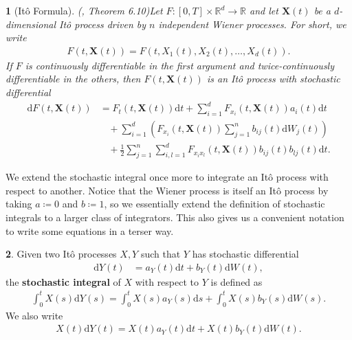 \documentclass[english]{article}
\numberwithin{equation}{section}
\numberwithin{figure}{section}
\theoremstyle{bolddescit}
\newtheorem{theorem}{\protect\theoremname}[section]
\theoremstyle{definition}
\newtheorem{definition}[theorem]{\protect\definitionname}
\theoremstyle{definition}
\theoremstyle{plain}
\theoremstyle{plain}
\theoremstyle{bolddesc}
\theoremstyle{plain}
\theoremstyle{remark}
\providecommand{\definitionname}{Definition}
\providecommand{\theoremname}{Theorem}
\begin{document}
\begin{theorem}[It\^o Formula]
  (\cite{capinski_blackscholes_2012}, Theorem 6.10)\label{thm:ito-formula}
  Let $F : [0,T] \times \mathbb{R}^d \to \mathbb{R}$ and let $\mathbf{X}(t)$ be a $d$-dimensional It\^o process driven by $n$ independent Wiener processes. For short, we write
  \begin{align*}
    F(t,\mathbf{X}(t)) = F(t,X_1(t),X_2(t),\ldots,X_d(t)).
  \end{align*}
  If $F$ is continuously differentiable in the first argument and twice-continuously differentiable in the others, then $F(t,\mathbf{X}(t))$ is an It\^o process with stochastic differential
  \begin{align*}
    \mathrm{d}F(t,\mathbf{X}(t))
    &= F_t(t,\mathbf{X}(t)) \mathrm{d}t + \sum_{i=1}^d F_{x_i}(t,\mathbf{X}(t)) a_i(t) \mathrm{d}t\\
    &\ \ \ \ + \sum_{i=1}^d \left(F_{x_i}(t,\mathbf{X}(t)) \sum_{j=1}^n b_{ij}(t) \mathrm{d}W_j(t) \right)\\
    &\ \ \ \ + \frac{1}{2} \sum_{j=1}^n \sum_{i,l=1}^d F_{x_i x_l}(t,\mathbf{X}(t)) b_{ij}(t)b_{lj}(t) \mathrm{d}t.
  \end{align*}
\end{theorem}

We extend the stochastic integral once more to integrate an It\^o process with respect to another. Notice that the Wiener process is itself an It\^o process by taking $a \coloneq 0$ and $b \coloneq 1$, so we essentially extend the definition of stochastic integrals to a larger class of integrators. This also gives us a convenient notation to write some equations in a terser way.

\begin{definition}
  Given two It\^o processes $X, Y$ such that $Y$ has stochastic differential
  \begin{align*}
    \mathrm{d}Y(t) &= a_Y(t) \mathrm{d}t + b_Y(t) \mathrm{d}W(t),
  \end{align*}
  the \textbf{stochastic integral} of $X$ with respect to $Y$ is defined as
  \begin{align*}
    \int_0^t X(s) \mathrm{d}Y(s) = \int_0^t X(s) a_Y(s) \mathrm{d}s + \int_0^t X(s) b_Y(s) \mathrm{d}W(s).
  \end{align*}
  We also write
  \begin{align*}
    X(t) \mathrm{d}Y(t) = X(t) a_Y(t) \mathrm{d}t + X(t) b_Y(t) \mathrm{d}W(t).
  \end{align*}
\end{definition}
\end{document}
